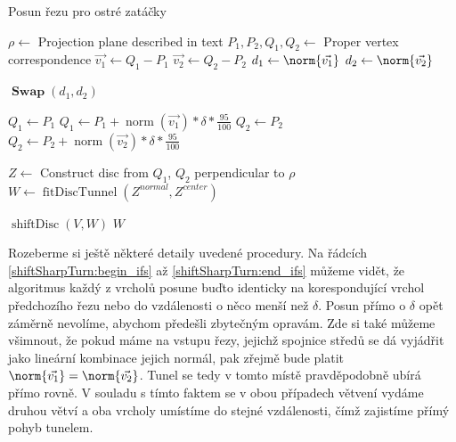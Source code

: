 \begin{algorithm}
\caption{Posun řezu pro ostré zatáčky}
\label{alg:shiftSharpTurn}
\begin{algorithmic}[1]

    \State $ \rho \gets $ Projection plane described in text
    \State $ P_1, P_2, Q_1, Q_2 \gets $ Proper vertex correspondence
    \State $ \vec{v_1} \gets Q_1 - P_1 $
    \State $ \vec{v_2} \gets Q_2 - P_2 $
    \State $ d_1 \gets \norm{\vec{v_1}} $
    \State $ d_2 \gets \norm{\vec{v_2}} $

    \Statex
        \State $ \operatorname{\mathbf{Swap}}(d_1, d_2) $
    \EndIf

    \Statex
     \label{shiftSharpTurn:begin_ifs}
        \State $ Q_1 \gets P_1$
    \Else
        \State $ Q_1 \gets P_1 + \operatorname{norm}(\vec{v_1}) * \delta * \frac{95}{100} $
    \EndIf
        \State $ Q_2 \gets P_2$
    \Else
        \State $ Q_2 \gets P_2 + \operatorname{norm}(\vec{v_2}) * \delta * \frac{95}{100} $ \label{shiftSharpTurn:end_ifs}
    \EndIf

    \Statex
    \State $ Z \gets $ Construct disc from $ Q_1$, $Q_2$ perpendicular to $ \rho $
    \State $ W \gets \operatorname{fitDiscTunnel}(Z^{normal}, Z^{center}) $
    \Statex

        \State \Return $ \operatorname{shiftDisc}(V, W) $ \label{shiftSharpTurn:shift_disk}
    \Else
        \State \Return $ W $
    \EndIf

\EndFunction

\end{algorithmic}
\end{algorithm}

Rozeberme si ještě některé detaily uvedené procedury. Na řádcích
\ref{shiftSharpTurn:begin_ifs} až \ref{shiftSharpTurn:end_ifs} můžeme vidět, že
algoritmus každý z vrcholů posune buďto identicky na korespondující vrchol
předchozího řezu nebo do vzdálenosti o něco menší než $ \delta $. Posun přímo
o $ \delta $ opět záměrně nevolíme, abychom předešli zbytečným opravám. Zde si
také můžeme všimnout, že pokud máme na vstupu řezy, jejichž spojnice středů
se dá vyjádřit jako lineární kombinace jejich normál, pak zřejmě bude platit
$ \norm{\vec{v_1}} = \norm{\vec{v_2}} $. Tunel se tedy v tomto místě
pravděpodobně ubírá přímo rovně. V souladu s tímto faktem se v obou případech
větvení vydáme druhou větví a oba vrcholy umístíme do stejné vzdálenosti, čímž
zajistíme přímý pohyb tunelem.

